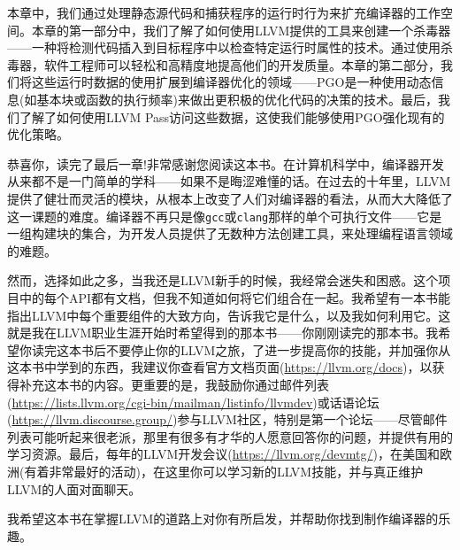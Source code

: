 本章中，我们通过处理静态源代码和捕获程序的运行时行为来扩充编译器的工作空间。本章的第一部分中，我们了解了如何使用LLVM提供的工具来创建一个杀毒器——一种将检测代码插入到目标程序中以检查特定运行时属性的技术。通过使用杀毒器，软件工程师可以轻松和高精度地提高他们的开发质量。本章的第二部分，我们将这些运行时数据的使用扩展到编译器优化的领域——PGO是一种使用动态信息(如基本块或函数的执行频率)来做出更积极的优化代码的决策的技术。最后，我们了解了如何使用LLVM Pass访问这些数据，这使我们能够使用PGO强化现有的优化策略。

恭喜你，读完了最后一章!非常感谢您阅读这本书。在计算机科学中，编译器开发从来都不是一门简单的学科——如果不是晦涩难懂的话。在过去的十年里，LLVM提供了健壮而灵活的模块，从根本上改变了人们对编译器的看法，从而大大降低了这一课题的难度。编译器不再只是像\texttt{gcc}或\texttt{clang}那样的单个可执行文件——它是一组构建块的集合，为开发人员提供了无数种方法创建工具，来处理编程语言领域的难题。

然而，选择如此之多，当我还是LLVM新手的时候，我经常会迷失和困惑。这个项目中的每个API都有文档，但我不知道如何将它们组合在一起。我希望有一本书能指出LLVM中每个重要组件的大致方向，告诉我它是什么，以及我如何利用它。这就是我在LLVM职业生涯开始时希望得到的那本书——你刚刚读完的那本书。我希望你读完这本书后不要停止你的LLVM之旅，了进一步提高你的技能，并加强你从这本书中学到的东西，我建议你查看官方文档页面(\url{https://llvm.org/docs})，以获得补充这本书的内容。更重要的是，我鼓励你通过邮件列表(\url{https://lists.llvm.org/cgi-bin/mailman/listinfo/llvmdev})或话语论坛(\url{https://llvm.discourse.group/})参与LLVM社区，特别是第一个论坛——尽管邮件列表可能听起来很老派，那里有很多有才华的人愿意回答你的问题，并提供有用的学习资源。最后，每年的LLVM开发会议(\url{https://llvm.org/devmtg/})，在美国和欧洲(有着非常最好的活动)，在这里你可以学习新的LLVM技能，并与真正维护LLVM的人面对面聊天。

我希望这本书在掌握LLVM的道路上对你有所启发，并帮助你找到制作编译器的乐趣。







